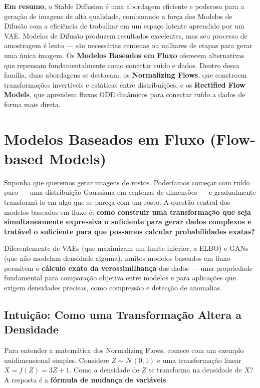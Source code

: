 \documentclass{tufte-handout}
\begin{document}
\textbf{Em resumo}, o Stable Diffusion é uma abordagem eficiente e poderosa para a geração de imagens de alta qualidade, combinando a força dos Modelos de Difusão com a eficiência de trabalhar em um espaço latente aprendido por um VAE.
\medskip
\noindent Modelos de Difusão produzem resultados excelentes, mas seu processo de amostragem é lento --- são necessárias centenas ou milhares de etapas para gerar uma única imagem. Os \textbf{Modelos Baseados em Fluxo} oferecem alternativas que repensam fundamentalmente como conectar ruído e dados. Dentro dessa família, duas abordagens se destacam: os \textbf{Normalizing Flows}, que constroem transformações invertíveis e estáticas entre distribuições, e os \textbf{Rectified Flow Models}, que aprendem fluxos ODE dinâmicos para conectar ruído a dados de forma mais direta.

\section{Modelos Baseados em Fluxo (Flow-based Models)}

Suponha que queremos gerar imagens de rostos. Poderíamos começar com ruído puro --- uma distribuição Gaussiana em centenas de dimensões --- e gradualmente transformá-lo em algo que se pareça com um rosto. A questão central dos modelos baseados em fluxo é: \textbf{como construir uma transformação que seja simultaneamente expressiva o suficiente para gerar dados complexos e tratável o suficiente para que possamos calcular probabilidades exatas?}

Diferentemente de VAEs (que maximizam um limite inferior, a ELBO) e GANs (que não modelam densidade alguma), muitos modelos baseados em fluxo permitem o \textbf{cálculo exato da verossimilhança} dos dados --- uma propriedade fundamental para comparação objetiva entre modelos e para aplicações que exigem densidades precisas, como compressão e detecção de anomalias.

\subsection{Intuição: Como uma Transformação Altera a Densidade}

Para entender a matemática dos Normalizing Flows, comece com um exemplo unidimensional simples. Considere $Z \sim \mathcal{N}(0, 1)$ e uma transformação linear $X = f(Z) = 3Z + 1$. Como a densidade de $Z$ se transforma na densidade de $X$? A resposta é a \textbf{fórmula de mudança de variáveis}:
\end{document}
